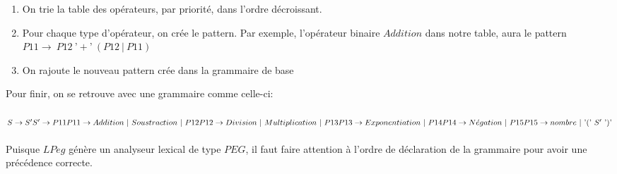 \documentclass{article}
\begin{document}
\begin{enumerate}
	\item On trie la table des opérateurs, par priorité, dans l'ordre décroissant.
	\item Pour chaque type d'opérateur, on crée le pattern. Par exemple, l'opérateur binaire $Addition$ dans notre table, aura le pattern \\ $P11 \rightarrow \ P12 \ \textrm{'}+\textrm{'} \ (P12 \ | \ P11)$
	\item On rajoute le nouveau pattern crée dans la grammaire de base
\end{enumerate}
Pour finir, on se retrouve avec une grammaire comme celle-ci: \\ \\
\begin{math}
S \rightarrow S' \\
S' \rightarrow P11 \\
P11 \rightarrow Addition \ | \ Soustraction \ | \ P12 \\
P12 \rightarrow Division \ | \ Multiplication \ | \ P13 \\
P13 \rightarrow Exponentiation \ | \ P14 \\
P14 \rightarrow N\acute{e}gation \ | \ P15 \\
P15 \rightarrow nombre \ | \ \textrm{'}(\textrm{'} \ S' \ \textrm{'})\textrm{'}
\end{math} \\ \\
Puisque $LPeg$ génère un analyseur lexical de type $PEG$, il faut faire attention à l'ordre de déclaration de la grammaire pour avoir une précédence correcte.
\end{document}
